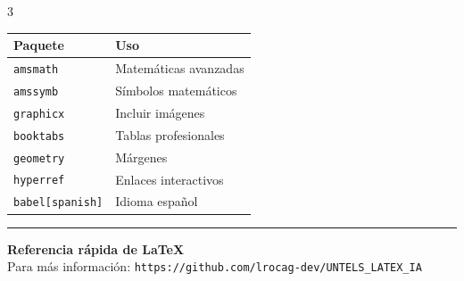 \documentclass[10pt,landscape]{article}
\newcommand{\comando}[1]{\texttt{\textcolor{azulprofundo}{#1}}}
\begin{document}
\begin{multicols}{3}
\begin{tabular}{@{}ll@{}}
    \toprule
    \textbf{Paquete} & \textbf{Uso} \\
    \midrule
    \comando{amsmath} & Matemáticas avanzadas \\
    \comando{amssymb} & Símbolos matemáticos \\
    \comando{graphicx} & Incluir imágenes \\
    \comando{booktabs} & Tablas profesionales \\
    \comando{geometry} & Márgenes \\
    \comando{hyperref} & Enlaces interactivos \\
    \comando{babel[spanish]} & Idioma español \\
    \bottomrule
\end{tabular}

\end{multicols}

\vspace{0.5cm}

\begin{center}
    \rule{0.8\textwidth}{0.5pt}
    \vspace{0.3cm}
    
    \textbf{Referencia rápida de LaTeX} \\
    Para más información: \texttt{https://github.com/lrocag-dev/UNTELS\_LATEX\_IA}
    \vspace{0.3cm}
\end{center}
\end{document}

